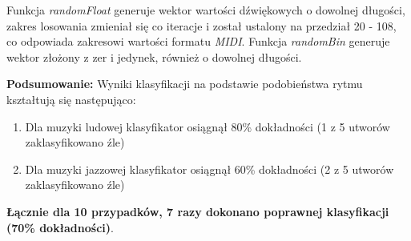Funkcja \textit{randomFloat} generuje wektor wartości dźwiękowych o dowolnej długości, zakres losowania zmieniał się co iteracje i został ustalony na przedział 20 - 108, co odpowiada zakresowi wartości formatu \textit{MIDI}. Funkcja \textit{randomBin} generuje wektor złożony z zer i jedynek, również o dowolnej długości.

\label{tabela 3}

\textbf{Podsumowanie:}
Wyniki klasyfikacji na podstawie podobieństwa rytmu kształtują się następująco:

\begin{enumerate}
    \item Dla muzyki ludowej klasyfikator osiągnął 80\% dokładności (1 z 5 utworów zaklasyfikowano źle)
    \item Dla muzyki jazzowej klasyfikator osiągnął 60\% dokładności (2 z 5 utworów zaklasyfikowano źle)
\end{enumerate}

\textbf{Łącznie dla 10 przypadków, 7 razy dokonano poprawnej klasyfikacji (70\% dokładności)}.

